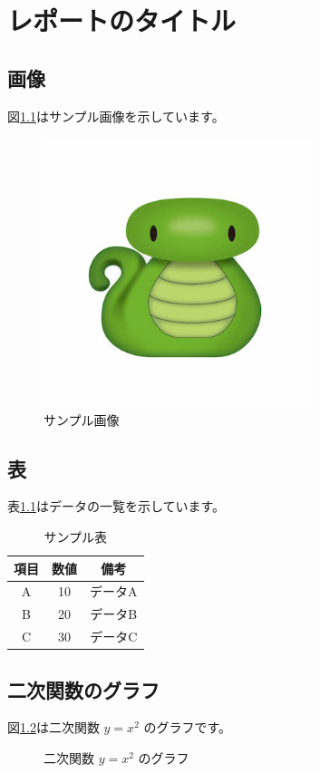 \documentclass{report}
\begin{document}
\chapter{レポートのタイトル}

\section{画像}
図\ref{fig:sample}はサンプル画像を示しています。
\begin{figure}[htbp]
  \centering
  \includegraphics[width=0.7\textwidth]{Its_me.jpg}
  \caption{サンプル画像}
  \label{fig:sample}
\end{figure}

\section{表}
表\ref{tab:sample}はデータの一覧を示しています。
\begin{table}[htbp]
  \centering
  \caption{サンプル表}
  \begin{tabular}{|c|c|c|}
    \hline
    項目 & 数値 & 備考   \\
    \hline
    A  & 10 & データA \\
    B  & 20 & データB \\
    C  & 30 & データC \\
    \hline
  \end{tabular}
  \label{tab:sample}
\end{table}

\section{二次関数のグラフ}
図\ref{fig:quadratic}は二次関数 $y = x^2$ のグラフです。
\begin{figure}[htbp]
  \centering
  \caption{二次関数 $y = x^2$ のグラフ}
  \label{fig:quadratic}
  \cite{einstein1905}
\end{figure}
\end{document}
